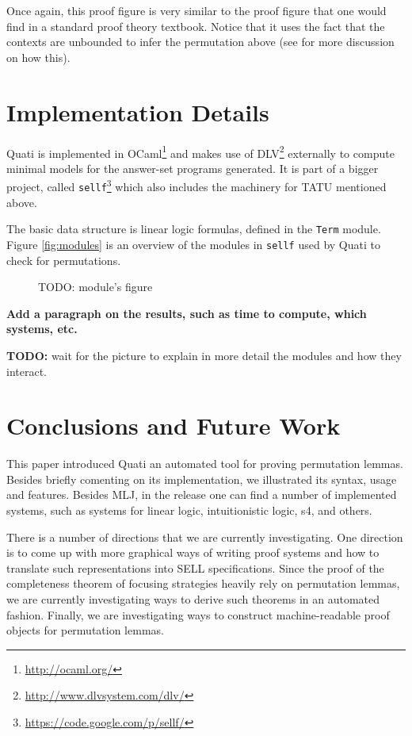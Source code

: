 \documentclass{llncs}
\begin{document}
Once again, this proof figure is very similar to the proof figure that one would find in a standard proof theory textbook.
Notice that it uses the fact that the contexts are unbounded to infer the permutation above (see \cite{nigam13iclp} for 
more discussion on how this).

\section{Implementation Details}
\label{sec:impl}

Quati is implemented in OCaml\footnote{\url{http://ocaml.org/}} and makes use of
DLV\footnote{\url{http://www.dlvsystem.com/dlv/}} externally to compute minimal models for the
answer-set programs generated. It is part of a bigger project, called
\texttt{sellf}\footnote{\url{https://code.google.com/p/sellf/}} which also includes the
machinery for TATU mentioned above. 

The basic data structure is linear logic formulas,
defined in the \texttt{Term} module. Figure \ref{fig:modules} is an overview
of the modules in \texttt{sellf} used by Quati to check for permutations.

\begin{figure}
TODO: module's figure
\end{figure}

\textbf{Add a paragraph on the results, such as time to compute, which systems, etc.}

\textbf{TODO:} wait for the picture to explain in more detail the modules and how they
interact.

\section{Conclusions and Future Work}
\label{sec:conc}
This paper introduced Quati an automated tool for proving permutation lemmas. Besides briefly 
comenting on its implementation, we illustrated its syntax, usage and features. Besides MLJ, in the release
one can find a number of implemented systems, such as systems for linear logic, intuitionistic logic, s4, 
and others. 

There is a number of directions that we are currently investigating. One direction is to come up with 
more graphical ways of writing proof systems and how to translate such representations into SELL specifications. 
Since the proof of the completeness theorem of focusing strategies heavily rely on permutation lemmas, we are 
currently investigating ways to derive such theorems in an automated fashion. Finally, we are investigating
ways to construct machine-readable proof objects for permutation lemmas.
\end{document}
